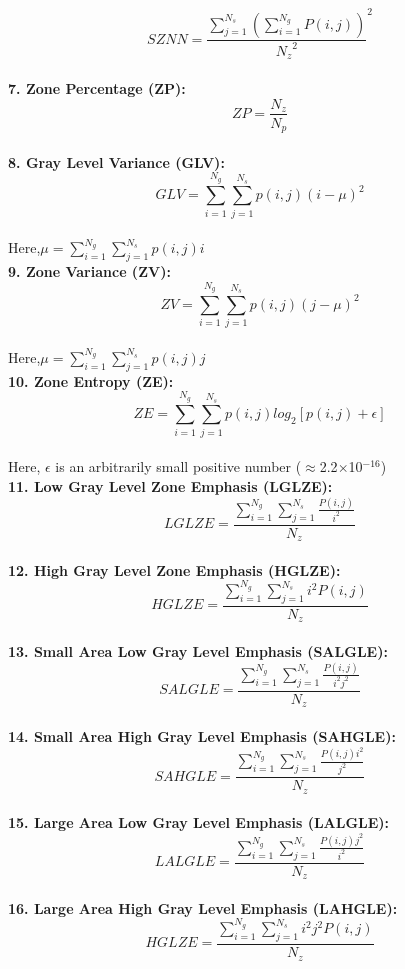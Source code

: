 \[SZNN=\frac{\sum _{j=1}^{N_{s}}\left(\sum _{i=1}^{N_{g}}P\left(i,j\right)\right)}{{N_{z}}^{2}}^{2}\]\\
\textbf{7. Zone Percentage (ZP):}\\
\[ZP=\frac{N_{z}}{N_{p}}\]\\
\textbf{8. Gray Level Variance (GLV):}\\
\[GLV=\sum _{i=1}^{N_{g}}\sum _{j=1}^{N_{s}}p\left(i,j\right)\left(i-\mu \right)^{2}\]\\
Here,$\mu =\sum _{i=1}^{N_{g}}\sum _{j=1}^{N_{s}}p\left(i,j\right)i$\\
\textbf{9. Zone Variance (ZV):}\\
\[ZV=\sum _{i=1}^{N_{g}}\sum _{j=1}^{N_{s}}p\left(i,j\right)\left(j-\mu \right)^{2}\]\\
Here,$\mu =\sum _{i=1}^{N_{g}}\sum _{j=1}^{N_{s}}p\left(i,j\right)j$\\
\textbf{10. Zone Entropy (ZE):}\\
\[ZE=\sum _{i=1}^{N_{g}}\sum _{j=1}^{N_{s}}p\left(i,j\right)log_{2}\left[p\left(i,j\right)+\epsilon \right]\]\\
Here, $\epsilon $ is an arbitrarily small positive number (${\approx}$2.2${\times}$10$^{-16}$)\\
\textbf{11. Low Gray Level Zone Emphasis (LGLZE):}\\
\[\textit{LGLZE}=\frac{\sum _{i=1}^{N_{g}}\sum _{j=1}^{N_{s}}\frac{P\left(i,j\right)}{i^{2}}}{N_{z}}\]\\
\textbf{12. High Gray Level Zone Emphasis (HGLZE):}\\
\[\textit{HGLZE}=\frac{\sum _{i=1}^{N_{g}}\sum _{j=1}^{N_{s}}i^{2}P\left(i,j\right)}{N_{z}}\] \\
\textbf{13. Small Area Low Gray Level Emphasis (SALGLE):}
\[\textit{SALGLE}=\frac{\sum _{i=1}^{N_{g}}\sum _{j=1}^{N_{s}}\frac{P\left(i,j\right)}{i^{2}j^{2}}}{N_{z}}\]\\
\textbf{14. Small Area High Gray Level Emphasis (SAHGLE):}\\
\[\textit{SAHGLE}=\frac{\sum _{i=1}^{N_{g}}\sum _{j=1}^{N_{s}}\frac{P\left(i,j\right)i^{2}}{j^{2}}}{N_{z}}\]\\
\textbf{15. Large Area Low Gray Level Emphasis (LALGLE):}\\
\[\textit{LALGLE}=\frac{\sum _{i=1}^{N_{g}}\sum _{j=1}^{N_{s}}\frac{P\left(i,j\right)j^{2}}{i^{2}}}{N_{z}}\]\\
\textbf{16. Large Area High Gray Level Emphasis (LAHGLE):}\\
\[\textit{HGLZE}=\frac{\sum _{i=1}^{N_{g}}\sum _{j=1}^{N_{s}}i^{2}j^{2}P\left(i,j\right)}{N_{z}}\]\\


